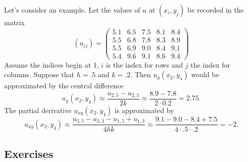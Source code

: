 Let's consider an example. Let the values of $u$ at $(x_i,y_j)$ be
recorded in the matrix
\begin{equation}\label{umatrix}
(u_{ij}) =
 \left( \begin{array}{ccccc}
        5.1 & 6.5 & 7.5 & 8.1 & 8.4 \\
        5.5 & 6.8 & 7.8 & 8.3 & 8.9 \\
        5.5 & 6.9 & 9.0 & 8.4 & 9.1 \\
        5.4 & 9.6 & 9.1 & 8.6 & 9.4
           \end{array} \right)
\end{equation}
Assume the indices begin at 1, $i$ is the index for rows and $j$ the index for columns. Suppose that $h = .5$ and $k = .2$. Then $u_y(x_2,y_4)$ would be
approximated by the central difference
$$
u_y(x_2,y_4) \approx \frac{u_{2,5} - u_{2,3}}{2k}
               \approx \frac{8.9 - 7.8}{2 \cdot 0.2} = 2.75.
$$
The partial derivative $u_{xy}(x_2,y_4)$ is approximated by
$$
u_{xy}(x_2,y_4) \approx \frac{u_{3,5} - u_{3,3} - u_{1,5} + u_{1,3}}{4hk}
               \approx \frac{9.1 - 9.0 - 8.4 + 7.5}{4\cdot .5 \cdot .2}
                 = -2.
$$



\subsection*{Exercises}



